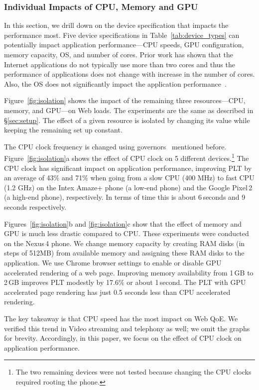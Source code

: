 \subsubsection{Individual Impacts of CPU, Memory and GPU}
\label{sec:impact_cpu}
In this section, we drill down on the device specification that impacts the performance most. Five device specifications in Table~\ref{tab:device_types} can potentially impact application performance---CPU speeds, GPU configuration, memory capacity, OS, and number of cores. Prior work \cite{gao2015study,blake2010evolution} 
has shown that the Internet applications do not typically 
use more than two cores and thus the performance of applications does not change with increase in the number of cores. Also, the OS  does not significantly impact the application performance~\cite{corral2016preserving}. %

Figure~\ref{fig:isolation} shows the impact of the remaining three resources---CPU, memory, and GPU---on Web loads. The experiments are the same as described in \S\ref{sec:setup}. The effect of a given resource is isolated by changing its value while keeping the remaining set up constant. 

The CPU clock frequency is changed using governors~\cite{ad-governors} mentioned before. Figure~\ref{fig:isolation}a shows the effect of CPU clock on 5 different devices.\footnote{The two remaining devices were not tested because changing the CPU clocks required rooting the phone.} 
The CPU clock has significant impact on application performance, improving PLT by an average of 43\% and 71\% 
when going from a slow CPU (400 MHz) to fast CPU (1.2 GHz) on the Intex Amaze+ phone (a low-end phone) and the Google Pixel\,2 (a high-end phone), respectively. In terms of time this is about 6\,seconds 
and 9\,seconds respectively.

Figures~\ref{fig:isolation}b and \ref{fig:isolation}c show that the effect of memory and GPU is much less drastic compared to CPU. These experiments were conducted on the Nexus\,4 phone.
We change memory capacity by creating RAM disks \cite{ramdisks} (in steps of 512MB) from available memory and assigning these RAM disks to the application.  %
We use Chrome browser settings to enable or disable  GPU accelerated rendering of a web page. Improving memory availability from 1\,GB to 2\,GB improves PLT  modestly by 17.6\% or about 1\,second. 
The PLT with GPU accelerated page rendering has just 0.5 seconds less than CPU accelerated rendering.  

The key takeaway is that CPU speed has the most impact on Web QoE. We verified this trend in Video streaming and telephony as well; we omit the graphs for brevity. 
Accordingly, in this paper, we focus on the effect of CPU clock on application performance. 


 
